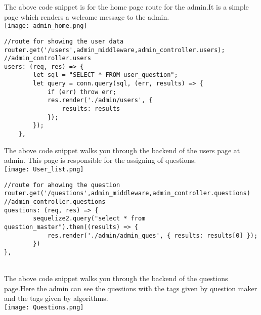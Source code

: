 \documentclass[a4paper,12pt,oneside]{book}
\begin{document}
The above code snippet is for the home page route for the admin.It is a simple page which renders a welcome message to the admin.\\
\texttt{[image: admin\_home.png]}
\begin{lstlisting}[caption = Users List]
//route for showing the user data
router.get('/users',admin_middleware,admin_controller.users);
//admin_controller.users
users: (req, res) => {
        let sql = "SELECT * FROM user_question";
        let query = conn.query(sql, (err, results) => {
            if (err) throw err;
            res.render('./admin/users', {
                results: results
            });
        });
    },
\end{lstlisting}
The above  code snippet walks you through the backend of the users page at admin.
This page is responsible for the assigning of questions.\\
\texttt{[image: User\_list.png]}\\
\begin{lstlisting}[caption=Questions list]
//route for ahowing the question
router.get('/questions',admin_middleware,admin_controller.questions)
//admin_controller.questions
questions: (req, res) => {
        sequelize2.query("select * from question_master").then((results) => {
            res.render('./admin/admin_ques', { results: results[0] });
        })
},
\end{lstlisting}\\
The above code snippet walks you through the backend of the questions page.Here the admin can see the questions with the tags given by question maker and the tags given by algorithms.\\
\texttt{[image: Questions.png]}\\
\end{document}

